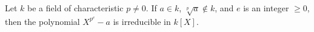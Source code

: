 Let $k$ be a field of characteristic $p \neq 0$. If $a \in k$, $\sqrt[p]{a} \notin k$, and $e$ is an integer $\geq 0$, then the polynomial $X^{p^e} - a$ is irreducible in $k[X]$.

